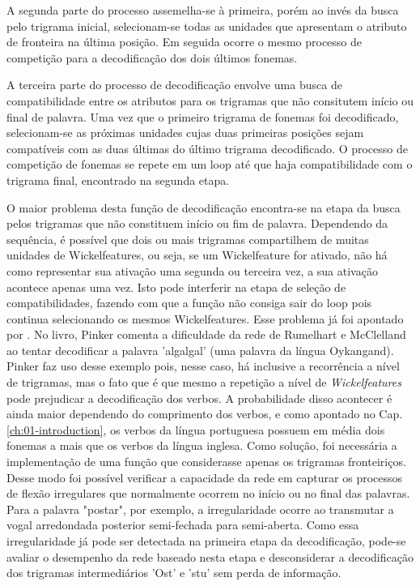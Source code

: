 A segunda parte do processo assemelha-se à primeira, porém ao invés da busca pelo trigrama inicial, selecionam-se todas as unidades que apresentam o atributo de fronteira na última posição. Em seguida ocorre o mesmo processo de competição para a decodificação dos dois últimos fonemas.

A terceira parte do processo de decodificação envolve uma busca de compatibilidade entre os atributos para os trigramas que não consitutem início ou final de palavra. Uma vez que o primeiro trigrama de fonemas foi decodificado, selecionam-se as próximas unidades cujas duas primeiras posições sejam compatíveis com as duas últimas do último trigrama decodificado. O processo de competição de fonemas se repete em um loop até que haja compatibilidade com o trigrama final, encontrado na segunda etapa.

O maior problema desta função de decodificação encontra-se na etapa da busca pelos trigramas que não constituem início ou fim de palavra. Dependendo da sequência, é possível que dois ou mais trigramas compartilhem de muitas unidades de Wickelfeatures, ou seja, se um Wickelfeature for ativado, não há como representar sua ativação uma segunda ou terceira vez, a sua ativação acontece apenas uma vez. Isto pode interferir na etapa de seleção de compatibilidades, fazendo com que a função não consiga sair do loop pois continua selecionando os mesmos Wickelfeatures. Esse problema já foi apontado por \cite{Pinker:1999}.
No livro, Pinker comenta a dificuldade da rede de Rumelhart e McClelland ao tentar decodificar a palavra 'algalgal' (uma palavra da língua Oykangand). Pinker faz uso desse exemplo pois, nesse caso, há inclusive a recorrência a nível de trigramas, mas o fato que é que mesmo a repetição a nível de \textit{Wickelfeatures} pode prejudicar a decodificação dos verbos. A probabilidade disso acontecer é ainda maior dependendo do comprimento dos verbos, e como apontado no Cap. \ref{ch:01-introduction}, os verbos da língua portuguesa possuem em média dois fonemas a mais que os verbos da língua inglesa. Como solução, foi necessária a implementação de uma função que considerasse apenas os trigramas fronteiriços. Desse modo foi possível verificar a capacidade da rede em capturar os processos de flexão irregulares que normalmente ocorrem no início ou no final das palavras. Para a palavra "postar", por exemplo, a irregularidade ocorre ao transmutar a vogal arredondada posterior semi-fechada para semi-aberta. Como essa irregularidade já pode ser detectada na primeira etapa da decodificação, pode-se avaliar o desempenho da rede baseado nesta etapa e desconsiderar a decodificação dos trigramas intermediários 'Ost' e 'stu' sem perda de informação.  

